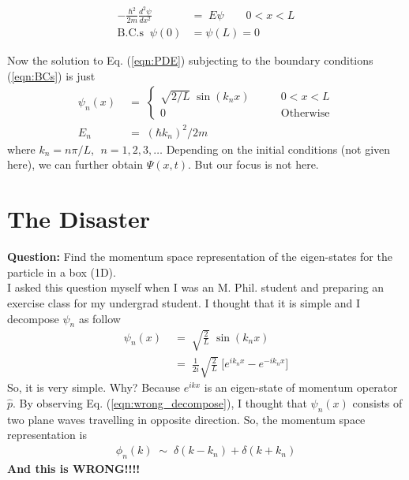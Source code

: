 \documentclass[12pt,a4paper]{article}
\begin{document}
\begin{align}
	 -\frac{\hbar^{2}}{2m} \frac{d^{2} \psi}{d x^{2}} \; &= \; E \psi \qquad 0 < x < L \label{eqn:PDE} \\
	 \mathrm{B.C.s} \; \; \psi(0) &= \psi(L) = 0 \label{eqn:BCs}
\end{align}

Now the solution to Eq. (\ref{eqn:PDE}) subjecting to the boundary conditions (\ref{eqn:BCs}) is just
\begin{align}
	\psi_{n}(x) \; &= \; 
	\begin{cases}
	\sqrt{2/L} \; \sin (k_{n} x) \qquad & 0 < x < L \\
	0 \qquad & \mathrm{Otherwise}
	\end{cases}
	 \label{eqn:eigenstate}\\
	E_{n} \; &= \;  (\hbar k_{n})^{2} / 2m \label{eqn:eigenenergy}
\end{align}
where $k_{n} = n \pi / L$, $\; n = 1, 2, 3, \dots$  Depending on the initial conditions (not given here), we can further obtain $\Psi(x, t)$. But our focus is not here.



\clearpage



\section{The Disaster} \label{sec:wrong_deduction}
\textbf{Question:} Find the momentum space representation of the eigen-states for the particle in a box (1D).\\

I asked this question myself when I was an M. Phil. student and preparing an exercise class for my undergrad student. I thought that it is simple and I decompose $\psi_{n}$ as follow
\begin{align}
	\psi_{n}(x) \; &= \;  \sqrt{\frac{2}{L}} \; \sin (k_{n} x) \label{eqn:wrong_eigenstate} \\
	\; &= \;   \frac{1}{2i} \sqrt{\frac{2}{L}} \; \Big[ e^{ik_{n}x} - e^{-ik_{n}x} \Big] \label{eqn:wrong_decompose}
\end{align}
So, it is very simple. Why? Because $e^{ikx}$ is an eigen-state of momentum operator $\hat{p}$. By observing Eq. (\ref{eqn:wrong_decompose}), I thought that $\psi_{n}(x)$ consists of two plane waves travelling in opposite direction. So, the momentum space representation is
\begin{align}
	\phi_{n}(k) \; \sim \;   \delta(k - k_{n}) + \delta(k + k_{n})
\end{align}
\textbf{And this is WRONG!!!!}
\end{document}
